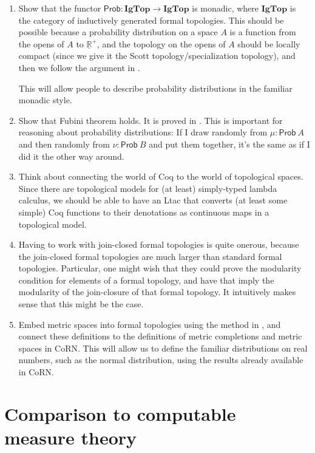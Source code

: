 \documentclass{article}           %
\begin{document}
\begin{enumerate}
\item Show that the functor $\mathsf{Prob} : \mathbf{IgTop} \to \mathbf{IgTop}$ is monadic, where $\mathbf{IgTop}$ is the category of inductively generated formal topologies. This should be possible because a probability distribution on a space $A$ is a function from the opens of $A$ to $\underline{\mathbb{R}}^+$, and the topology on the opens of $A$ should be locally compact (since we give it the Scott topology/specialization topology), and then we follow the argument in \cite{maietti2005}.

This will allow people to describe probability distributions in the familiar monadic style.

\item Show that Fubini theorem holds. It is proved in \cite{vickers2011}. This is important for reasoning about probability distributions: If I draw randomly from $\mu : \mathsf{Prob}\ A$ and then randomly from $\nu : \mathsf{Prob}\ B$ and put them together, it's the same as if I did it the other way around.

\item Think about connecting the world of Coq to the world of topological spaces. Since there are topological models for (at least) simply-typed lambda calculus, we should be able to have an Ltac that converts (at least some simple) Coq functions to their denotations as continuous maps in a topological model. 

\item Having to work with join-closed formal topologies is quite onerous, because the join-closed formal topologies are much larger than standard formal topologies. Particular, one might wish that they could prove the modularity condition for elements of a formal topology, and have that imply the modularity of the join-closure of that formal topology. It intuitively makes sense that this might be the case.

\item Embed metric spaces into formal topologies using the method in \cite{palmgren2007}, and connect these definitions to the definitions of metric completions and metric spaces in CoRN\cite{oconnor2008}. This will allow us to define the familiar distributions on real numbers, such as the normal distribution, using the results already available in CoRN. 
\end{enumerate}

\section{Comparison to computable measure theory}
\end{document}
